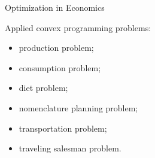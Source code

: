 \begin{frame}{Optimization in Economics}

Applied convex programming problems:

\begin{itemize}
\item production problem;
\item consumption problem;
\item diet problem;
\item nomenclature planning problem;
\item transportation problem;
\item traveling salesman problem.
\end{itemize}

\end{frame}